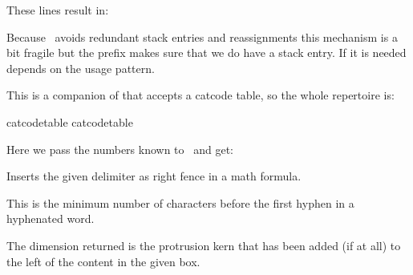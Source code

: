 \startbuffer[three]
\MyDim 15pt \bgroup \the\MyDim \space
    \constrained\MyDim\zeropoint
    \bgroup
        \bgroup \retained\advance{} \the\MyDim \egroup\space
        \bgroup \retained\advance{} \the\MyDim \egroup\space
    \egroup
    \bgroup
        \bgroup \retained\advance{} \the\MyDim \egroup\space
        \bgroup \retained\advance{} \the\MyDim \egroup\space
    \egroup
\egroup \the\MyDim
\stopbuffer


These lines result in:

\startlines
\hbox{\getbuffer[one]}
\hbox{\getbuffer[two]}
\hbox{\getbuffer[three]}
\stoplines

Because \LUAMETATEX\ avoids redundant stack entries and reassignments this
mechanism is a bit fragile but the  prefix makes sure that we
do have a stack entry. If it is needed depends on the usage pattern.

\stopnewprimitive

\startnewprimitive[title={\prm {retokenized}}]

This is a companion of  that accepts a catcode table, so the
whole repertoire is:

\startbuffer
{}
\tokenized   catcodetable 
\tokenized   catcodetable 
\retokenized              {}
\retokenized              {}
\stopbuffer

\typebuffer

Here we pass the numbers known to \CONTEXT\ and get:

\startlines
\getbuffer
\stoplines

\stopnewprimitive

\startoldprimitive[title={\prm {right}}]

Inserts the given delimiter as right fence in a math formula.

\stopoldprimitive

\startoldprimitive[title={\prm {righthyphenmin}}]

This is the minimum number of characters before the first hyphen in a hyphenated
word.

\stopoldprimitive

\startnewprimitive[title={\prm {rightmarginkern}}]

The dimension returned is the protrusion kern that has been added (if at all) to
the left of the content in the given box.

